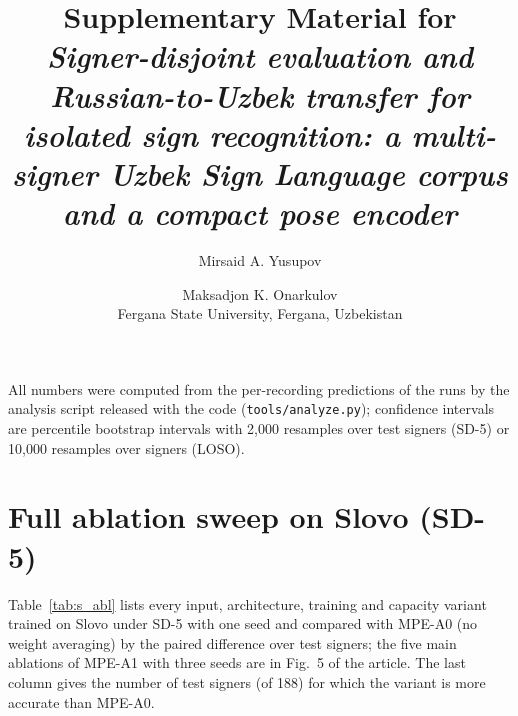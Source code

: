 \documentclass[a4paper,10pt]{article}
\title{Supplementary Material for\\ \emph{Signer-disjoint evaluation and Russian-to-Uzbek transfer for isolated sign recognition: a multi-signer Uzbek Sign Language corpus and a compact pose encoder}}
\author{Mirsaid A. Yusupov \and Maksadjon K. Onarkulov\\ \small Fergana State University, Fergana, Uzbekistan}
\date{}
\begin{document}
\maketitle
\noindent All numbers were computed from the per-recording predictions of the runs by the analysis script released with the code (\texttt{tools/analyze.py}); confidence intervals are percentile bootstrap intervals with 2,000 resamples over test signers (SD-5) or 10,000 resamples over signers (LOSO).
\section{Full ablation sweep on Slovo (SD-5)}
Table~\ref{tab:s_abl} lists every input, architecture, training and capacity variant trained on Slovo under SD-5 with one seed and compared with MPE-A0 (no weight averaging) by the paired difference over test signers; the five main ablations of MPE-A1 with three seeds are in Fig.~5 of the article. The last column gives the number of test signers (of 188) for which the variant is more accurate than MPE-A0.
\end{document}
